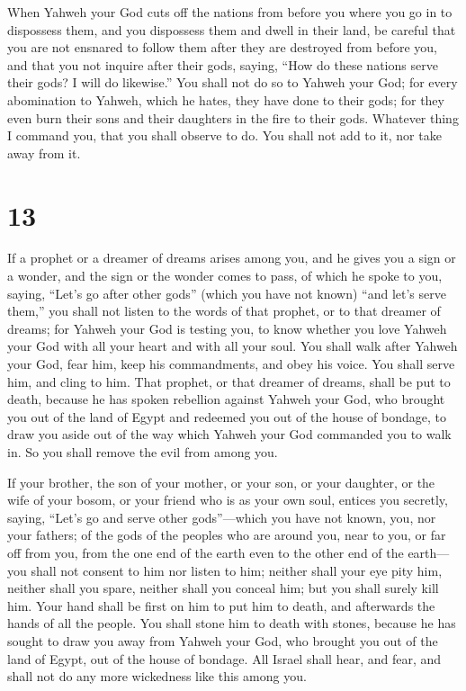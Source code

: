  When Yahweh your God cuts off the nations from before
you where you go in to dispossess them, and you dispossess them and
dwell in their land,  be careful that you are not
ensnared to follow them after they are destroyed from before you, and
that you not inquire after their gods, saying, ``How do these nations
serve their gods? I will do likewise.''  You shall not do
so to Yahweh your God; for every abomination to Yahweh, which he hates,
they have done to their gods; for they even burn their sons and their
daughters in the fire to their gods.  Whatever thing I
command you, that you shall observe to do. You shall not add to it, nor
take away from it.

\hypertarget{section-12}{%
\section{13}\label{section-12}}

 If a prophet or a dreamer of dreams arises among you, and
he gives you a sign or a wonder,  and the sign or the
wonder comes to pass, of which he spoke to you, saying, ``Let's go after
other gods'' (which you have not known) ``and let's serve them,''
 you shall not listen to the words of that prophet, or to
that dreamer of dreams; for Yahweh your God is testing you, to know
whether you love Yahweh your God with all your heart and with all your
soul.  You shall walk after Yahweh your God, fear him,
keep his commandments, and obey his voice. You shall serve him, and
cling to him.  That prophet, or that dreamer of dreams,
shall be put to death, because he has spoken rebellion against Yahweh
your God, who brought you out of the land of Egypt and redeemed you out
of the house of bondage, to draw you aside out of the way which Yahweh
your God commanded you to walk in. So you shall remove the evil from
among you.

 If your brother, the son of your mother, or your son, or
your daughter, or the wife of your bosom, or your friend who is as your
own soul, entices you secretly, saying, ``Let's go and serve other
gods''---which you have not known, you, nor your fathers; 
of the gods of the peoples who are around you, near to you, or far off
from you, from the one end of the earth even to the other end of the
earth---  you shall not consent to him nor listen to him;
neither shall your eye pity him, neither shall you spare, neither shall
you conceal him;  but you shall surely kill him. Your hand
shall be first on him to put him to death, and afterwards the hands of
all the people.  You shall stone him to death with
stones, because he has sought to draw you away from Yahweh your God, who
brought you out of the land of Egypt, out of the house of bondage.
 All Israel shall hear, and fear, and shall not do any
more wickedness like this among you.

